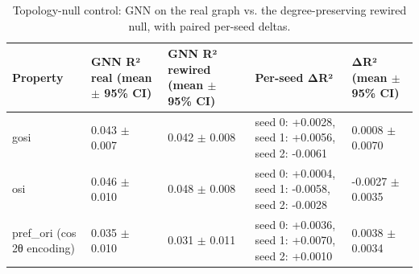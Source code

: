 \begin{table}[htbp]
  \centering
  \caption{Topology-null control: GNN on the real graph vs. the degree-preserving rewired null, with paired per-seed deltas.}
  \label{tab:null}
  \begin{tabular}{lllll}
    \toprule
    Property & GNN R² real (mean $\pm$ 95\% CI) & GNN R² rewired (mean $\pm$ 95\% CI) & Per-seed ΔR² & ΔR² (mean $\pm$ 95\% CI) \\
    \midrule
    gosi & 0.043 $\pm$ 0.007 & 0.042 $\pm$ 0.008 & seed 0: +0.0028, seed 1: +0.0056, seed 2: -0.0061 & 0.0008 $\pm$ 0.0070 \\
    osi & 0.046 $\pm$ 0.010 & 0.048 $\pm$ 0.008 & seed 0: +0.0004, seed 1: -0.0058, seed 2: -0.0028 & -0.0027 $\pm$ 0.0035 \\
    pref\_ori (cos 2θ encoding) & 0.035 $\pm$ 0.010 & 0.031 $\pm$ 0.011 & seed 0: +0.0036, seed 1: +0.0070, seed 2: +0.0010 & 0.0038 $\pm$ 0.0034 \\
    \bottomrule
  \end{tabular}
\end{table}
